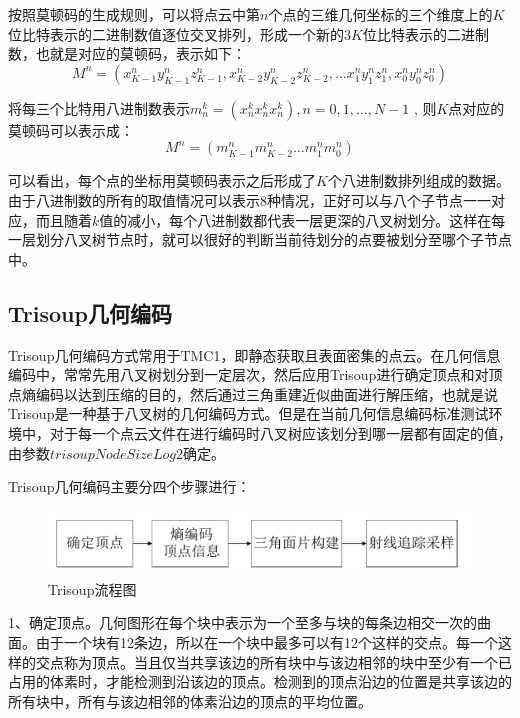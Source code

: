 \documentclass[bachelor,print,msfonts]{xduthesis}
\begin{document}
按照莫顿码的生成规则，可以将点云中第$n$个点的三维几何坐标的三个维度上的$K$位比特表示的二进制数值逐位交叉排列，形成一个新的$3K$位比特表示的二进制数，也就是对应的莫顿码，表示如下：
\begin{equation}
    M^{n}=\left(x_{K-1}^{n} y_{K-1}^{n} z_{K-1}^{n}, x_{K-2}^{n} y_{K-2}^{n} z_{K-2}^{n}, \ldots x_{1}^{n} y_{1}^{n} z_{1}^{n}, x_{0}^{n} y_{0}^{n} z_{0}^{n}\right)
\end{equation}

将每三个比特用八进制数表示$
    m_{n}^{k}=\left(x_{n}^{k} x_{n}^{k} x_{n}^{k}\right), n=0,1, \ldots, N-1
$ , 则$K$点对应的莫顿码可以表示成：
\begin{equation}
    M^{n}=\left(m_{K-1}^{n} m_{K-2}^{n} \ldots m_{1}^{n} m_{0}^{n}\right)
\end{equation}

可以看出，每个点的坐标用莫顿码表示之后形成了$K$个八进制数排列组成的数据。由于八进制数的所有的取值情况可以表示8种情况，正好可以与八个子节点一一对应，而且随着$k$值的减小，每个八进制数都代表一层更深的八叉树划分。这样在每一层划分八叉树节点时，就可以很好的判断当前待划分的点要被划分至哪个子节点中。
\subsection{Trisoup几何编码}
Trisoup几何编码方式常用于TMC1，即静态获取且表面密集的点云。在几何信息编码中，常常先用八叉树划分到一定层次，然后应用Trisoup进行确定顶点和对顶点熵编码以达到压缩的目的，然后通过三角重建近似曲面进行解压缩，也就是说Trisoup是一种基于八叉树的几何编码方式。但是在当前几何信息编码标准测试环境中，对于每一个点云文件在进行编码时八叉树应该划分到哪一层都有固定的值，由参数$trisoupNodeSizeLog2$确定。

Trisoup几何编码主要分四个步骤进行：
\begin{figure}[h]
    \centering
    \includegraphics[scale=0.5]{image/Trisoup流程图_crop.pdf}
    \caption{Trisoup流程图}
\end{figure}

1、确定顶点。几何图形在每个块中表示为一个至多与块的每条边相交一次的曲面。由于一个块有12条边，所以在一个块中最多可以有12个这样的交点。每一个这样的交点称为顶点。当且仅当共享该边的所有块中与该边相邻的块中至少有一个已占用的体素时，才能检测到沿该边的顶点。检测到的顶点沿边的位置是共享该边的所有块中，所有与该边相邻的体素沿边的顶点的平均位置。
\end{document}
